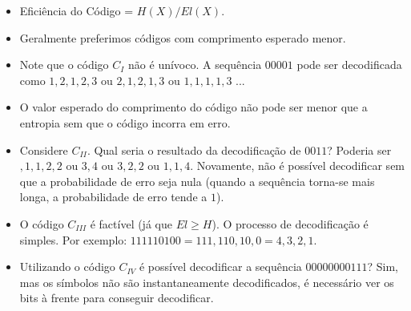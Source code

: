 \begin{frame}[allowframebreaks]
  \begin{itemize}
  \item Eficiência do Código = $H(X) / El(X)$.
  \item Geralmente preferimos códigos com comprimento esperado menor.
  \item Note que o código $C_I$ não é unívoco. A sequência $00001$ pode ser decodificada como
	$1,2,1,2,3$ ou $2,1,2,1,3$ ou $1,1,1,1,3$ ...
  \item O valor esperado do comprimento do código não pode ser menor que a entropia sem que o código
	incorra em erro.
  \item Considere $C_{II}$. Qual seria o resultado da decodificação de $0011$? Poderia ser
	$,1,1,2,2$ ou $3,4$ ou $3,2,2$ ou $1,1,4$. Novamente, não é possível decodificar sem
	que a probabilidade de erro seja nula (quando a sequência torna-se mais longa, a probabilidade
	de erro tende a $1$).
  \item O código $C_{III}$ é factível (já que $El \geq H$). O processo de decodificação é simples.
	Por exemplo: $111110100 = 111,110,10,0 = 4,3,2,1$.
  \item Utilizando o código $C_{IV}$ é possível decodificar a sequência $00000000111$? Sim, mas 
	os símbolos não são instantaneamente decodificados, é necessário ver os bits à frente para 
	conseguir decodificar.
  \end{itemize}
 
\end{frame}



